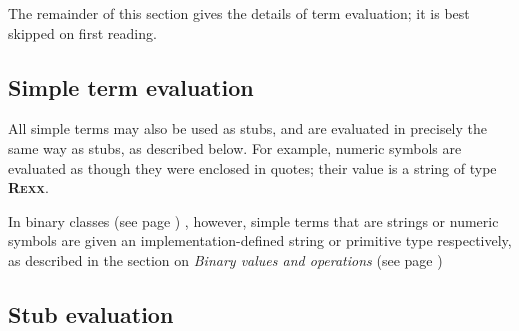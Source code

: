 The remainder of this section gives the details of term
evaluation; it is best skipped on first reading.
\subsection{Simple term evaluation}
 
All simple terms may also be used as stubs, and are evaluated in
precisely the same way as stubs, as described below.  For example,
numeric symbols are evaluated as though they were enclosed in quotes;
their value is a string of type \textbf{R\textsc{exx}}.
 
In  binary classes (see page \pageref{refbincla}) , however, simple terms that are
strings or numeric symbols are given an implementation-defined string or
primitive type respectively, as described in the section on
 \emph{Binary values and operations} (see page \pageref{refbinary}) 
\subsection{Stub evaluation}
 
